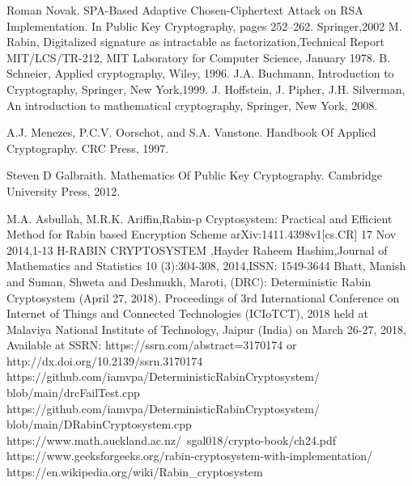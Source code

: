 \documentclass[letterpaper, 12 pt, conference]{ieeeconf}  %
\begin{document}
\begin{thebibliography}{99}

Roman Novak. SPA-Based Adaptive Chosen-Ciphertext Attack on RSA Implementation. In Public Key Cryptography, pages 252–262. Springer,2002
 M. Rabin, Digitalized signature as intractable as factorization,Technical Report MIT/LCS/TR-212, MIT Laboratory for Computer Science, January 1978.
B. Schneier, Applied cryptography, Wiley, 1996.
J.A. Buchmann, Introduction to Cryptography, Springer, New York,1999.
J. Hoffstein, J. Pipher, J.H. Silverman, An introduction to mathematical cryptography, Springer, New York, 2008.

A.J. Menezes, P.C.V. Oorschot, and S.A. Vanstone. Handbook Of Applied Cryptography. CRC Press, 1997.

Steven D Galbraith. Mathematics Of Public Key Cryptography. Cambridge University Press, 2012.

 M.A. Asbullah, M.R.K. Ariffin,Rabin-p Cryptosystem: Practical and Efficient Method for Rabin based Encryption Scheme arXiv:1411.4398v1[cs.CR] 17 Nov 2014,1-13
H-RABIN CRYPTOSYSTEM ,Hayder Raheem Hashim,Journal of Mathematics and Statistics 10 (3):304-308, 2014,ISSN: 1549-3644 
Bhatt, Manish and Suman, Shweta and Deshmukh, Maroti, (DRC): Deterministic Rabin Cryptosystem (April 27, 2018). Proceedings of 3rd International Conference on Internet of Things and Connected Technologies (ICIoTCT), 2018 held at Malaviya National Institute of Technology, Jaipur (India) on March 26-27, 2018, Available at SSRN: https://ssrn.com/abstract=3170174 or http://dx.doi.org/10.2139/ssrn.3170174
https://github.com/iamvpa/DeterministicRabinCryptosystem/
blob/main/drcFailTest.cpp
https://github.com/iamvpa/DeterministicRabinCryptosystem/
blob/main/DRabinCryptosystem.cpp
https://www.math.auckland.ac.nz/~sgal018/crypto-book/ch24.pdf
https://www.geeksforgeeks.org/rabin-cryptosystem-with-implementation/
https://en.wikipedia.org/wiki/Rabin\_cryptosystem
\end{thebibliography}
\end{document}

